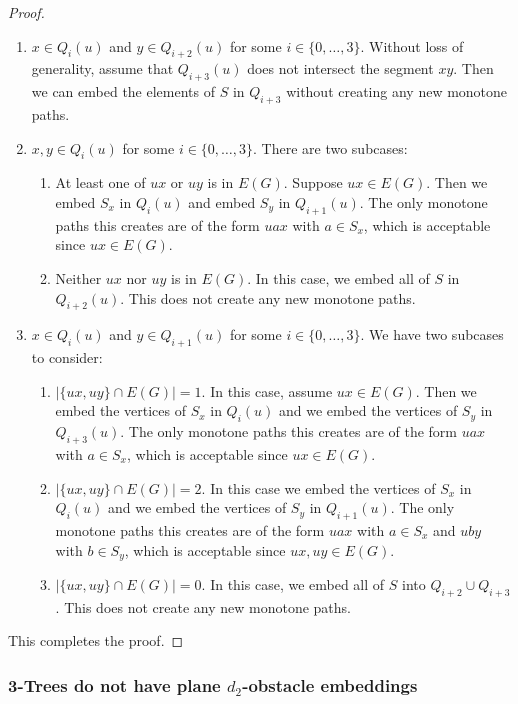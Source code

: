 \documentclass{patmorin}
\begin{document}
\begin{proof}
  \begin{enumerate}

  \item  $x\in Q_i(u)$ and $y\in Q_{i+2}(u)$ for some
  $i\in\{0,\ldots,3\}$. Without loss of generality, assume that
  $Q_{i+3}(u)$ does not intersect the segment $xy$. Then we can embed the
  elements of $S$ in $Q_{i+3}$ without creating any new monotone paths.

  \item $x,y\in Q_i(u)$ for some $i\in\{0,\ldots,3\}$. There are two
  subcases:
    \begin{enumerate}
      \item At least one of $ux$ or $uy$ is in $E(G)$. Suppose $ux\in E(G)$.
      Then we embed $S_x$ in $Q_i(u)$ and embed $S_y$ in $Q_{i+1}(u)$.
      The only monotone paths this creates are of the form $uax$ with
      $a\in S_x$, which is acceptable since $ux\in E(G)$.
      \item Neither $ux$ nor $uy$ is in $E(G)$. In this case, we embed all
    of $S$ in $Q_{i+2}(u)$.  This does not create any new monotone paths.
    \end{enumerate}

  \item $x\in Q_i(u)$ and $y\in Q_{i+1}(u)$ for some $i\in\{0,\ldots,3\}$.
  We have two subcases to consider:
    \begin{enumerate}
      \item $|\{ux,uy\}\cap E(G)|=1$.  In this case, assume $ux\in
      E(G)$. Then we embed the vertices of $S_x$ in $Q_i(u)$ and we
      embed the vertices of $S_y$ in $Q_{i+3}(u)$.  The only monotone
      paths this creates are of the form $uax$ with $a\in S_x$, which
      is acceptable since $ux\in E(G)$.
      \item $|\{ux,uy\}\cap E(G)|=2$.  In this case we embed the
      vertices of $S_x$ in $Q_i(u)$ and we embed the vertices of $S_y$
      in $Q_{i+1}(u)$.  The only monotone paths this creates are of the
      form $uax$ with $a\in S_x$ and $uby$ with $b\in S_y$, which is
      acceptable since $ux,uy\in E(G)$.
      \item $|\{ux,uy\}\cap E(G)|=0$.  In this case, we embed all of
      $S$ into $Q_{i+2}\cup Q_{i+3}$.  This does not create any new
      monotone paths.
    \end{enumerate}
  \end{enumerate}
This completes the proof.
\end{proof}

\subsubsection{3-Trees do not have plane $d_2$-obstacle embeddings}
\end{document}
